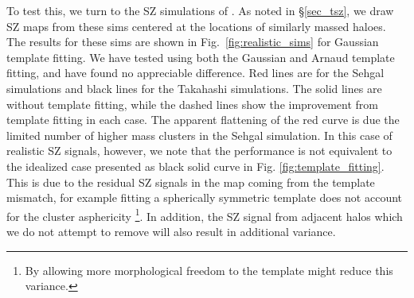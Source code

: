 To test this, we turn to the SZ simulations of \citet{sehgal10, takahashi17}. 
As noted in \S\ref{sec_tsz}, we draw SZ maps from these sims centered at the locations of similarly massed haloes. 
The results for these sims are shown in Fig.~\ref{fig:realistic_sims} for Gaussian template fitting. 
We have tested using both the Gaussian and Arnaud template fitting, and have found no appreciable difference. 
Red lines are for the Sehgal simulations and black lines for the Takahashi simulations. 
The solid lines are without template fitting, while the dashed lines show the improvement from template fitting in each case. 
 The apparent flattening of the red curve is due the limited number of higher mass clusters in the Sehgal simulation. 
 In this case of realistic SZ signals, however, we note that the performance is not equivalent to the idealized case presented as black solid curve in Fig. \ref{fig:template_fitting}. 
This is due to the residual SZ signals in the map coming from the template mismatch, for example fitting a spherically symmetric template does not account for the cluster asphericity \footnote{By allowing more morphological freedom to the template might reduce this variance.}. In addition, the SZ signal from adjacent halos which we do not attempt to remove will also result in additional variance.
 





